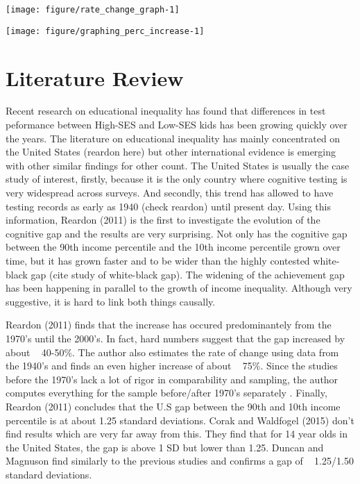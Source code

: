 \documentclass[11pt, a4paper]{article}\usepackage[]{graphicx}\usepackage[]{color}
\begin{document}
{\centering \texttt{[image: figure/rate\_change\_graph-1]} 

}








{\centering \texttt{[image: figure/graphing\_perc\_increase-1]} 

}









\section{Literature Review}

Recent research on educational inequality has found that differences in test peformance between High-SES and Low-SES kids has been growing quickly over the years. The literature on educational inequality has mainly concentrated on the United States (reardon here) but other international evidence is emerging with other similar findings for other count. The United States is usually the case study of interest, firstly, because it is the only country where cognitive testing is very widespread across surveys. And secondly, this trend has allowed to have testing records as early as 1940 (check reardon) until present day. Using this information, Reardon (2011) is the first to investigate the evolution of the cognitive gap and the results are very surprising. Not only has the cognitive gap between the 90th income percentile and the 10th income percentile grown over time, but it has grown faster and to be wider than the highly contested white-black gap (cite study of white-black gap). The widening of the achievement gap has been happening in parallel to the growth of income inequality. Although very suggestive, it is hard to link both things causally.

Reardon (2011) finds that the increase has occured predominantely from the 1970's until the 2000's. In fact, hard numbers suggest that the gap increased by about ~ 40-50\%. The author also estimates the rate of change using data from the 1940's and finds an even higher increase of about ~ 75\%. Since the studies before the 1970's lack a lot of rigor in comparability and sampling, the author computes everything for the sample before/after 1970's separately . Finally, Reardon (2011) concludes that the U.S gap between the 90th and 10th income percentile is at about 1.25 standard deviations. Corak and Waldfogel (2015) don't find results which are very far away from this. They find that for 14 year olds in the United States, the gap is above 1 SD but lower than 1.25. Duncan and Magnuson find similarly to the previous studies and confirms a gap of ~ 1.25/1.50 standard deviations.
\end{document}

